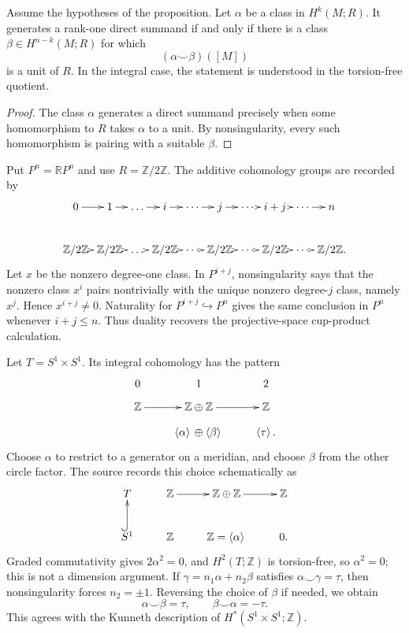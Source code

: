 \begin{corollary}
\label{at-lemma-primitive-dual-class}
Assume the hypotheses of the proposition.
Let $\alpha$ be a class in $H^k(M;R)$.
It generates a rank-one direct summand if
and only if there is a class
$\beta\in H^{n-k}(M;R)$ for which
$$
(\alpha\smile\beta)([M])
$$
is a unit of $R$.  In the integral case,
the statement is understood in the
torsion-free quotient.
\end{corollary}

\begin{proof}
The class $\alpha$ generates a direct
summand precisely when some homomorphism to
$R$ takes $\alpha$ to a unit.  By
nonsingularity, every such homomorphism is
pairing with a suitable $\beta$.
\end{proof}

\begin{example}
\label{at-example-rp-duality-product}
Put $P^n=\mathbb{R}P^n$ and use
$R=\mathbb{Z}/2\mathbb{Z}$.  The additive
cohomology groups are recorded by
$$
\xymatrix@C=.15em{
0\ar[r]&1\ar[r]&\ldots\ar[r]
  &i\ar[r]&\cdots\ar[r]
  &j\ar[r]&\cdots\ar[r]
  &i+j\ar[r]&\cdots\ar[r]&n\\
\mathbb{Z}/2\mathbb{Z}\ar[r]
  &\mathbb{Z}/2\mathbb{Z}\ar[r]
  &\ldots\ar[r]
  &\mathbb{Z}/2\mathbb{Z}\ar[r]
  &\cdots\ar[r]
  &\mathbb{Z}/2\mathbb{Z}\ar[r]
  &\cdots\ar[r]
  &\mathbb{Z}/2\mathbb{Z}\ar[r]
  &\cdots\ar[r]
  &\mathbb{Z}/2\mathbb{Z}.
}
$$
Let $x$ be the nonzero degree-one class.
In $P^{i+j}$, nonsingularity says that the
nonzero class $x^i$ pairs nontrivially with
the unique nonzero degree-$j$ class,
namely $x^j$.  Hence $x^{i+j}\neq 0$.
Naturality for
$P^{i+j}\hookrightarrow P^n$ gives the
same conclusion in $P^n$ whenever
$i+j\leq n$.  Thus duality recovers the
projective-space cup-product calculation.
\end{example}

\begin{example}
\label{at-example-torus-pairing}
Let $T=S^1\times S^1$.  Its integral
cohomology has the pattern
$$
\xymatrix@R=.8em{
0&1&2\\
\mathbb{Z}\ar[r]
  &\mathbb{Z}\oplus\mathbb{Z}\ar[r]
  &\mathbb{Z}\\
&\left\langle{}\alpha\right\rangle{}
 \oplus
 \left\langle{}\beta\right\rangle{}
  &\left\langle{}\tau\right\rangle{}.
}
$$
Choose $\alpha$ to restrict to a generator
on a meridian, and choose $\beta$ from the
other circle factor.  The source records
this choice schematically as
$$
\xymatrix{
T&\mathbb{Z}\ar[r]
  &\mathbb{Z}\oplus\mathbb{Z}\ar[r]
  &\mathbb{Z}\\
S^1\ar@{^{(}->}[u]
  &\mathbb{Z}
  &\mathbb{Z}
   =\left\langle{}\alpha
    \right\rangle{}
  &0.
}
$$
Graded commutativity gives
$2\alpha^2=0$, and $H^2(T;\mathbb{Z})$
is torsion-free, so $\alpha^2=0$; this is
not a dimension argument.  If
$\gamma=n_1\alpha+n_2\beta$ satisfies
$\alpha\smile\gamma=\tau$, then
nonsingularity forces $n_2=\pm1$.
Reversing the choice of $\beta$ if needed,
we obtain
$$
\alpha\smile\beta=\tau,
\qquad
\beta\smile\alpha=-\tau.
$$
This agrees with the Kunneth description
of $H^*(S^1\times S^1;\mathbb{Z})$.
\end{example}
